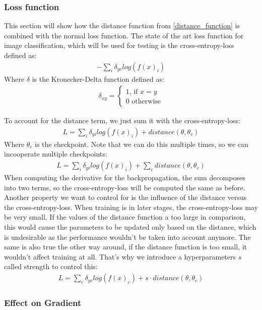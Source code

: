 \subsubsection{Loss function}
This section will show how the distance function from \ref{distance_function} is
combined with the normal loss function. The state of the art loss function for
image classification, which will be used for testing is the cross-entropy-loss
defined as:
\begin{align}
    -\sum_{i} \delta_{yc} log(f(x)_i)
\end{align}
Where $\delta$ is the Kronecker-Delta function defined as:
\begin{align}
    \delta_{xy} =
    \begin{cases}
        1 \textrm{, if } x=y \\
        0 \textrm{ otherwise}
    \end{cases}
\end{align}

To account for the distance term, we just sum it with the cross-entropy-loss:
\begin{align}
    L=\sum_{i} \delta_{yi} log(f(x)_i) + distance(\theta, \theta_c)
\end{align}
Where $\theta_c$ is the checkpoint.
Note that we can do this multiple times, so we can incooperate multiple
checkpoints:
\begin{align}
    L=\sum_{i} \delta_{yi} log(f(x)_i) + \sum_c distance(\theta, \theta_c)
\end{align}
 When computing the derivative for the backpropagation, the sum
decomposes into two terms, so the cross-entropy-loss will be computed the same
as before. Another property we want to control for is the influence of the
distance versus the cross-entropy-loss. When training is in later stages, the
cross-entropy-loss may be very small. If the values of the distance function a
too large in comparison, this would cause the parameters to be updated only
based on the distance, which is undesirable as the performance wouldn't be taken
into account anymore. The same is also true the other way around, if the
distance function is too small, it wouldn't affect training at all. That's why
we introduce a hyperparameters $s$ called strength to control this:
\begin{align}\label{eq:LossDistance}
    L=\sum_{c} \delta_{yc} log(f(x)_c) + s \cdot distance(\theta, \theta_c)
\end{align}

\subsubsection{Effect on Gradient}

